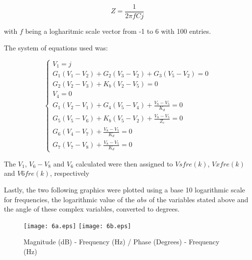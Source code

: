\begin{equation}
	Z=\frac{1}{2 \pi f C j}
\end{equation}

with $f$ being a logharitmic scale vector from -1 to 6 with 100 entries.

The system of equations used was:

$$
\begin{cases} 
	V_1 = j \\ 
	G_1 (V_1-V_2) + G_2 (V_3-V_2) + G_3 (V_5-V_2) = 0 \\
	G_2 (V_2-V_3) + K_b (V_2-V_5) = 0 \\
	V_4 = 0 \\
	G_1 (V_2-V_1) + G_4 (V_5-V_4) + \frac{V_8-V_5}{K_d} = 0 \\ 
	G_5 (V_5-V_6) + K_b (V_5-V_2) + \frac{V_8-V_5}{Z_c} = 0 \\
	G_6 (V_4-V_7) + \frac{V_8-V_5}{K_d} = 0 \\ 
	G_7 (V_7-V_8) + \frac{V_8-V_5}{K_d} = 0 
\label{system 6}
\end{cases}
$$

The $V_1$, $V_6 - V_8$ and $V_6$ calculated were then assigned to $Vsfre(k)$, $Vxfre(k)$ and $V6fre(k)$, respectively 

Lastly, the two following graphics were plotted using a base 10 logarithmic scale for frequencies, the logarithmic value of the $abs$ of the variables stated above and the angle of these complex variables, converted to degrees.



\begin{figure}[H]
    \texttt{[image: 6a.eps]}
    \hfill\texttt{[image: 6b.eps]}
    \centering
    \caption{Magnitude (dB) - Frequency (Hz) / Phase (Degrees) - Frequency (Hz)}
    \label{mag}
\end{figure}


